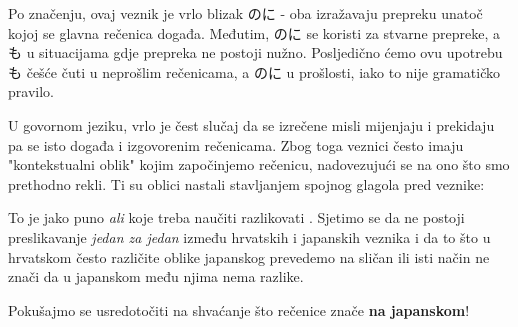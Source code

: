 	Po značenju, ovaj veznik je vrlo blizak のに - oba izražavaju prepreku unatoč kojoj se glavna rečenica događa. Međutim, のに se koristi za stvarne prepreke, a も u situacijama gdje prepreka ne postoji nužno. Posljedično ćemo ovu upotrebu も češće čuti u neprošlim rečenicama, a のに u prošlosti, iako to nije gramatičko pravilo.
	
	
	U govornom jeziku, vrlo je čest slučaj da se izrečene misli mijenjaju i prekidaju pa se isto događa i izgovorenim rečenicama. Zbog toga veznici često imaju "kontekstualni oblik" kojim započinjemo rečenicu, nadovezujući se na ono što smo prethodno rekli. Ti su oblici nastali stavljanjem spojnog glagola pred veznike:
	
	\begin{reibun}
	\end{reibun}

	To je jako puno \textit{ali} koje treba naučiti razlikovati \smiley. Sjetimo se da ne postoji preslikavanje \textit{jedan za jedan} između hrvatskih i japanskih veznika i da to što u hrvatskom često različite oblike japanskog prevedemo na sličan ili isti način ne znači da u japanskom među njima nema razlike.
	
	Pokušajmo se usredotočiti na shvaćanje što rečenice znače \textbf{na japanskom}!
	
